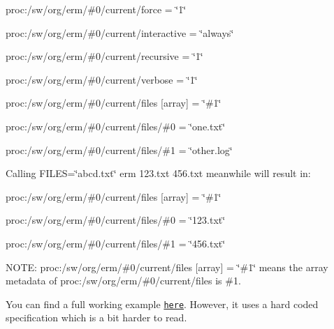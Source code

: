 \begin{DoxyItemize}
\item {\ttfamily proc\+:/sw/org/erm/\#0/current/force = \char`\"{}1\char`\"{}}
\item {\ttfamily proc\+:/sw/org/erm/\#0/current/interactive = \char`\"{}always\char`\"{}}
\item {\ttfamily proc\+:/sw/org/erm/\#0/current/recursive = \char`\"{}1\char`\"{}}
\item {\ttfamily proc\+:/sw/org/erm/\#0/current/verbose = \char`\"{}1\char`\"{}}
\item {\ttfamily proc\+:/sw/org/erm/\#0/current/files \mbox{[}array\mbox{]} = \char`\"{}\#1\char`\"{}}
\item {\ttfamily proc\+:/sw/org/erm/\#0/current/files/\#0 = \char`\"{}one.\+txt\char`\"{}}
\item {\ttfamily proc\+:/sw/org/erm/\#0/current/files/\#1 = \char`\"{}other.\+log\char`\"{}}
\end{DoxyItemize}

Calling {\ttfamily F\+I\+L\+ES=\char`\"{}abcd.\+txt\char`\"{} erm 123.\+txt 456.\+txt} meanwhile will result in\+:


\begin{DoxyItemize}
\item {\ttfamily proc\+:/sw/org/erm/\#0/current/files \mbox{[}array\mbox{]} = \char`\"{}\#1\char`\"{}}
\item {\ttfamily proc\+:/sw/org/erm/\#0/current/files/\#0 = \char`\"{}123.\+txt\char`\"{}}
\item {\ttfamily proc\+:/sw/org/erm/\#0/current/files/\#1 = \char`\"{}456.\+txt\char`\"{}}
\end{DoxyItemize}

N\+O\+TE\+: {\ttfamily proc\+:/sw/org/erm/\#0/current/files \mbox{[}array\mbox{]} = \char`\"{}\#1\char`\"{}} means the {\ttfamily array} metadata of {\ttfamily proc\+:/sw/org/erm/\#0/current/files} is {\ttfamily \#1}.

You can find a full working example \href{/home/jenkins/workspace/libelektra-release/examples/opts.c}{\tt here}. However, it uses a hard coded specification which is a bit harder to read. 